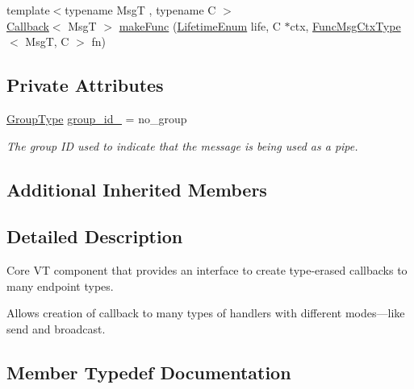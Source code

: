 \begin{DoxyCompactItemize}
\item 
{\footnotesize template$<$typename MsgT , typename C $>$ }\\\hyperlink{namespacevt_a36db99df4c973d48b1118a293fff533f}{Callback}$<$ MsgT $>$ \hyperlink{structvt_1_1pipe_1_1_pipe_manager_aeade0c95a974823a05ba925167c82889}{make\+Func} (\hyperlink{namespacevt_1_1pipe_acb42b284378c0fdac1d7c6335dc26f58}{Lifetime\+Enum} life, C $\ast$ctx, \hyperlink{structvt_1_1pipe_1_1_pipe_manager_base_a73fdf82ece0411b3dc644c99b763f7a9}{Func\+Msg\+Ctx\+Type}$<$ MsgT, C $>$ fn)
\end{DoxyCompactItemize}
\subsection*{Private Attributes}
\begin{DoxyCompactItemize}
\item 
\hyperlink{namespacevt_a27b5e4411c9b6140c49100e050e2f743}{Group\+Type} \hyperlink{structvt_1_1pipe_1_1_pipe_manager_a55c4e1e68f74a2a0796a24ea06711563}{group\+\_\+id\+\_\+} = no\+\_\+group
\begin{DoxyCompactList}\small\item\em The group ID used to indicate that the message is being used as a pipe. \end{DoxyCompactList}\end{DoxyCompactItemize}
\subsection*{Additional Inherited Members}


\subsection{Detailed Description}
Core VT component that provides an interface to create type-\/erased callbacks to many endpoint types. 

Allows creation of callback to many types of handlers with different modes---like send and broadcast. 

\subsection{Member Typedef Documentation}
\mbox{\label{structvt_1_1pipe_1_1_pipe_manager_a221ce8bc0fc6639f43dad1e53a08c0d2}} 
